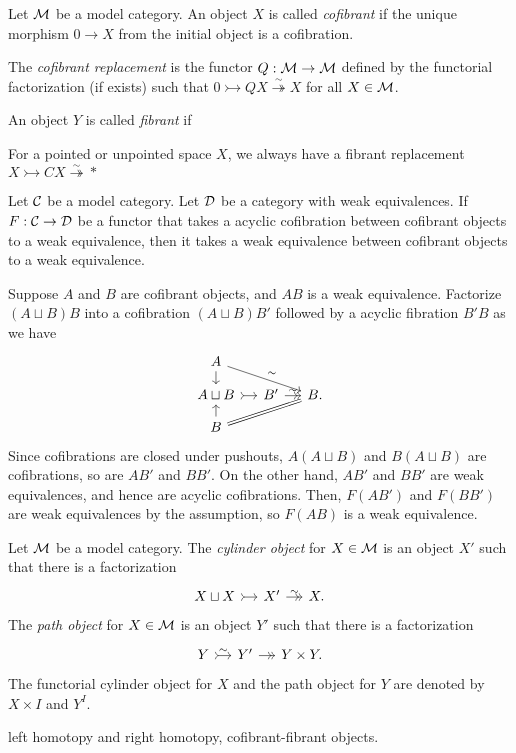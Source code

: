 \documentclass{../../large}
\newcommand{\cof}{\rightarrowtail}
\newcommand{\tfib}{\overset\sim\twoheadrightarrow}
\begin{document}
\begin{prb}
Let $\mathcal{M}$ be a model category.
An object $X$ is called \emph{cofibrant} if the unique morphism $0\to X$ from the initial object is a cofibration.

The \emph{cofibrant replacement} is the functor $Q:\mathcal{M}\to\mathcal{M}$ defined by the functorial factorization (if exists) such that $0\cof QX\tfib X$ for all $X\in\mathcal{M}$.

An object $Y$ is called \emph{fibrant} if

For a pointed or unpointed space $X$, we always have a fibrant replacement $X\rightarrowtail CX\overset\sim\twoheadrightarrow*$
\end{prb}




\begin{prb}
Let $\mathcal{C}$ be a model category.
Let $\mathcal{D}$ be a category with weak equivalences.
If $F:\mathcal{C}\to\mathcal{D}$ be a functor that takes a acyclic cofibration between cofibrant objects to a weak equivalence, then it takes a weak equivalence between cofibrant objects to a weak equivalence.
\end{prb}
\begin{pf}
Suppose $A$ and $B$ are cofibrant objects, and $AB$ is a weak equivalence.
Factorize $(A\sqcup B)B$ into a cofibration $(A\sqcup B)B'$ followed by a acyclic fibration $B'B$ as we have
\[\begin{tikzcd}[sep=small]
A \dar\ar{rrd}{\sim} &&\\
A\sqcup B \rar[>->] & B' \rar[->>]{\sim} & B.\\
B \uar\ar[equal]{rru} &&
\end{tikzcd}\]
Since cofibrations are closed under pushouts, $A(A\sqcup B)$ and $B(A\sqcup B)$ are cofibrations, so are $AB'$ and $BB'$.
On the other hand, $AB'$ and $BB'$ are weak equivalences, and hence are acyclic cofibrations.
Then, $F(AB')$ and $F(BB')$ are weak equivalences by the assumption, so $F(AB)$ is a weak equivalence.
\end{pf}



\begin{prb}
Let $\mathcal{M}$ be a model category.
The \emph{cylinder object} for $X\in\mathcal{M}$ is an object $X'$ such that there is a factorization
\[\begin{tikzcd}[sep=small]
X\sqcup X\rar[>->]&X'\rar[->>]{\sim}&X.
\end{tikzcd}\]
The \emph{path object} for $X\in\mathcal{M}$ is an object $Y'$ such that there is a factorization
\[\begin{tikzcd}[sep=small]
Y\rar[>->]{\sim}&Y'\rar[->>]&Y\times Y.
\end{tikzcd}\]
The functorial cylinder object for $X$ and the path object for $Y$ are denoted by $X\times I$ and $Y^I$.


left homotopy and right homotopy, cofibrant-fibrant objects.
\end{prb}
\end{document}
